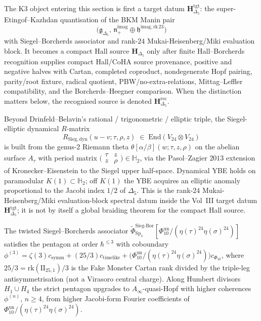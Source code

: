 \begin{remark}
\label{rem:sbc-hall-borcherds-gate}
The K3 object entering this section is first a target datum
$\mathbf H_{\Delta_5}^{\mathrm{tgt}}$: the super-Etingof--Kazhdan
quantisation of the BKM Manin pair
\[
\bigl(\mathfrak g_{\Delta_5},\,
\mathfrak n_+^{\mathrm{imag}}\oplus
\mathfrak h^{\mathrm{imag,rk\,23}}\bigr)
\]
with Siegel--Borcherds associator and rank-$24$
Mukai-Heisenberg/Miki evaluation block. It becomes a compact Hall
source $\mathbf H_{\Delta_5}$ only after finite Hall--Borcherds
recognition supplies compact Hall/CoHA source provenance, positive and
negative halves with Cartan, completed coproduct, nondegenerate Hopf
pairing, parity/root fixture, radical quotient, PBW/no-extra-relations,
Mittag--Leffler compatibility, and the Borcherds--Heegner comparison.
When the distinction matters below, the recognised source is denoted
$\mathbf H_{\Delta_5}^{\mathrm{rec}}$.
\end{remark}

\begin{remark}
\label{rem:sbc-R-sieg-fourth-class}
Beyond Drinfeld--Belavin's rational / trigonometric / elliptic triple, the
Siegel-elliptic dynamical $R$-matrix
\[
 R_{\mathrm{Sieg,dyn}}(u - v; \tau, \rho, z) \;\in\; \mathrm{End}(V_{24} \otimes V_{24})
\]
is built from the genus-$2$ Riemann theta $\theta[\alpha/\beta](w; \tau, z, \rho)$ on
the abelian surface $A_\tau$ with period matrix
$\bigl(\begin{smallmatrix}\tau & z\\ z & \rho\end{smallmatrix}\bigr) \in \mathbb{H}_2$,
via the Pasol--Zagier $2013$ extension of Kronecker--Eisenstein to the Siegel upper
half-space. Dynamical YBE holds on paramodular $K(1) \subset \mathbb{H}_2$; off $K(1)$
the YBE acquires an elliptic anomaly proportional to the Jacobi index $1/2$ of
$\Delta_5$. This is the rank-$24$ Mukai-Heisenberg/Miki evaluation-block
spectral datum inside the Vol~III target datum
$\mathbf H_{\Delta_5}^{\mathrm{tgt}}$; it is not by itself a global
braiding theorem for the compact Hall source.
\end{remark}

\begin{remark}
\label{rem:sbc-pentagon-sieg-bor}
The twisted Siegel--Borcherds associator
\(\widetilde{\Phi}^{\mathrm{Sieg\text{-}Bor}}_{\mathrm{Sp}_4}
[\Phi_{10}^{\mathrm{un}}/(\eta(\tau)^{24}\eta(\sigma)^{24})]\) satisfies the
pentagon at order $\hbar^{\leq 3}$ with coboundary
\(\phi^{(3)} = \zeta(3) c_{\mathrm{symm}} + (25/3) c_{\mathrm{timelike}}
+ \bigl(\Phi_{10}^{\mathrm{un}}/(\eta(\tau)^{24}\eta(\sigma)^{24})\bigr)c_{\Phi_{10}}\),
where $25/3 = \mathrm{rk}(\mathrm{II}_{25,1})/3$ is the Fake Monster Cartan rank divided
by the triple-leg antisymmetrisation (not a Virasoro central charge). Along Humbert
divisors $H_1 \cup H_4$ the strict pentagon upgrades to $A_\infty$-quasi-Hopf with
higher coherences $\phi^{(n)}$, $n \ge 4$, from higher Jacobi-form Fourier coefficients
of \(\Phi_{10}^{\mathrm{un}}/(\eta(\tau)^{24}\eta(\sigma)^{24})\).
\end{remark}

